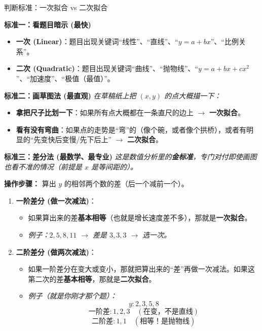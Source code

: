 \documentclass[12pt, a4paper]{article}
\begin{document}
\begin{knowpoint}{判断标准：一次拟合 vs 二次拟合}

    \textbf{标准一：看题目暗示 (最快)}
    \begin{itemize}
        \item \textbf{一次 (Linear)}：题目出现关键词“线性”、“直线”、“$y=a+bx$”、“比例关系”。
        \item \textbf{二次 (Quadratic)}：题目出现关键词“曲线”、“抛物线”、“$y=a+bx+cx^2$”、“加速度”、“极值（最值）”。
    \end{itemize}

    \vspace{1.0em}
    \textbf{标准二：画草图法 (最直观)}
    \textit{在草稿纸上把 $(x, y)$ 的点大概描一下：}
    \begin{itemize}
        \item \textbf{拿把尺子比划一下}：如果所有点大概都在一条直尺的边上 $\rightarrow$ \textbf{一次拟合}。
        \item \textbf{看有没有弯曲}：如果点的走势是“弯”的（像个碗，或者像个拱桥），或者有明显的“先变快后变慢/先下后上” $\rightarrow$ \textbf{二次拟合}。
    \end{itemize}

    \vspace{1.0em}
    \textbf{标准三：差分法 (最数学、最专业)}
    \textit{这是数值分析里的\textbf{金标准}，专门对付即使画图也看不准的情况（前提是 $x$ 是等间距的）。}
    
    \textbf{操作步骤：}
    算出 $y$ 的相邻两个数的差（后一个减前一个）。
    
    \begin{enumerate}
        \item \textbf{一阶差分 (做一次减法)}：
        \begin{itemize}
            \item 如果算出来的差\textbf{基本相等}（也就是增长速度差不多），那就是\textbf{一次拟合}。
            \item \textit{例子：$2, 5, 8, 11$ $\rightarrow$ 差是 $3, 3, 3$ $\rightarrow$ 选一次。}
        \end{itemize}
        
        \item \textbf{二阶差分 (做两次减法)}：
        \begin{itemize}
            \item 如果一阶差分在变大或变小，那就把算出来的“差”再做一次减法。如果这第二次的差\textbf{基本相等}，那就是\textbf{二次拟合}。
            \item \textit{例子（就是你刚才那个题）：}
            \[ y: 2, 3, 5, 8 \]
            \[ \text{一阶差}: 1, 2, 3 \quad (\text{在变，不是直线}) \]
            \[ \text{二阶差}: 1, 1 \quad (\text{相等！是抛物线}) \]
        \end{itemize}
    \end{enumerate}

\end{knowpoint}
\end{document}
